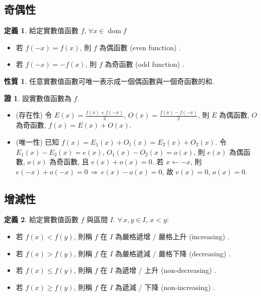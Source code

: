 \documentclass[12pt]{extarticle}
\newcommand{\ds}{\displaystyle}
\newcommand{\ie}{\,\Longrightarrow\,}
\DeclareMathOperator*{\dom}{dom}
\theoremstyle{definition}
\newtheorem*{dfn}{定義}
\newtheorem*{prp}{性質}
\newtheorem*{prf}{證}
\begin{document}
\subsection*{奇偶性}
\begin{dfn} 給定實數值函數 $f$, $\forall x\in\dom f$ 
  \begin{itemize}\setlength\itemsep{0em}
    \item 若 $f(-x) = f(x)$, 則 $f$ 為偶函數 (even function) . 
    \item 若 $f(-x) = -f(x)$, 則 $f$ 為奇函數 (odd function) . 
  \end{itemize}
\end{dfn}

\begin{prp}
  任意實數值函數可唯一表示成一個偶函數與一個奇函數的和. 
\end{prp}

\begin{prf} 設實數值函數為 $f$. 
  \begin{itemize}\setlength\itemsep{0em}
    \item (存在性) 令 $\ds E(x) = \frac{f(x) + f(-x)}{2}$, $\ds O(x) = \frac{f(x) - f(-x)}{2}$, 則 $E$ 為偶函數, $O$ 為奇函數, $f(x) = E(x) + O(x)$. 
    \item (唯一性) 已知 $\ds f(x) = E_1(x) + O_1(x) = E_2(x) + O_2(x)$. 令 $E_1(x) - E_2(x) = e(x)$, $O_1(x) - O_2(x) = o(x)$, 則 $e(x)$ 為偶函數, $o(x)$ 為奇函數, 且 $e(x) + o(x) = 0$. 若 $x\leftarrow -x$, 則 $e(-x) + o(-x) = 0 \ie e(x) - o(x) = 0$, 故 $e(x) = 0$, $o(x) = 0$. 
  \end{itemize}
\end{prf}

\subsection*{增減性}

\begin{dfn} 給定實數值函數 $f$ 與區間 $I$. $\forall\,x, y\in I$, $x < y$: 
  \begin{itemize}\setlength\itemsep{0em}
    \item 若 $f(x) < f(y)$, 則稱 $f$ 在 $I$ 為嚴格遞增 / 嚴格上升 (increasing) . 
    \item 若 $f(x) > f(y)$, 則稱 $f$ 在 $I$ 為嚴格遞減 / 嚴格下降 (decreasing) . 
    \item 若 $f(x) \leqslant f(y)$, 則稱 $f$ 在 $I$ 為遞增 / 上升 (non-decreasing) . 
    \item 若 $f(x) \geqslant f(y)$, 則稱 $f$ 在 $I$ 為遞減 / 下降 (non-increasing) . 
  \end{itemize}
\end{dfn}
\end{document}
